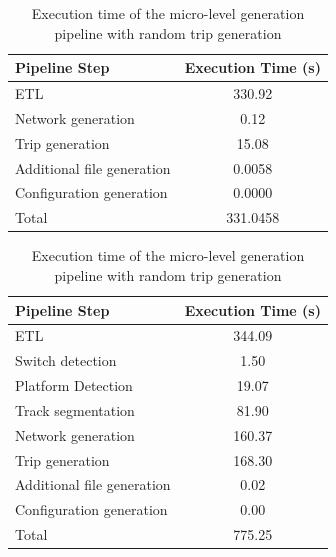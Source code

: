 \begin{table}[H]
    \centering
    \begin{minipage}[t]{0.48\textwidth}
        \centering
        \small
        \begin{tabular}{lc}
            \toprule
            Pipeline Step & Execution Time (s) \\
            \midrule
            ETL & 330.92 \\
            Network generation & 0.12 \\
            Trip generation & 15.08 \\
            Additional file generation & 0.0058 \\
            Configuration generation & 0.0000 \\
            Total & 331.0458 \\
            \bottomrule
        \end{tabular}
        \caption{Execution time of the macro-level generation pipeline for the example network}\label{tab:pipeline_performance_macro}
    \end{minipage}
    \hfill
    \begin{minipage}[t]{0.48\textwidth}
        \centering
        \small
        \begin{tabular}{lc}
            \toprule
            Pipeline Step & Execution Time (s) \\
            \midrule
            ETL & 344.09 \\
            Switch detection & 1.50 \\
            Platform Detection & 19.07 \\
            Track segmentation & 81.90 \\
            Network generation & 160.37 \\
            Trip generation & 168.30 \\
            Additional file generation & 0.02 \\
            Configuration generation & 0.00 \\
            Total & 775.25 \\
            \bottomrule
        \end{tabular}
        \caption{Execution time of the micro-level generation pipeline with random trip generation}\label{tab:pipeline_performance_micro}
    \end{minipage}

\end{table}

